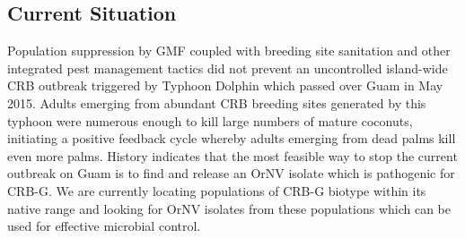 \documentclass[preprint,12pt]{elsarticle}
\begin{document}
\subsection{Current Situation}
Population suppression by GMF coupled with breeding site sanitation and other integrated pest management tactics did not prevent an uncontrolled island-wide CRB outbreak triggered by Typhoon Dolphin which passed over Guam in May 2015. Adults emerging from abundant CRB breeding sites generated by this typhoon were numerous enough to kill large numbers of mature coconuts, initiating a positive feedback cycle whereby adults emerging from dead palms kill even more palms. History indicates that the most feasible way to stop the current outbreak on Guam is to find and release an OrNV isolate which is pathogenic for CRB-G. We are currently locating populations of CRB-G biotype within its native range and looking for OrNV isolates from these populations which can be used for effective microbial control.
\end{document}
